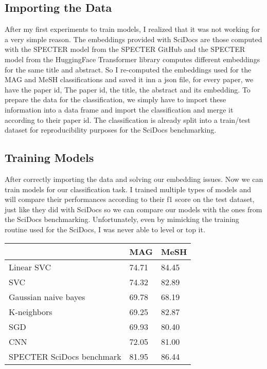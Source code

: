 \documentclass[conference]{IEEEtran}
\begin{document}
\subsection{Importing the Data}

After my first experiments to train models, I realized that it was not working for a very simple reason. The embeddings provided with SciDocs are those computed with the SPECTER model from the SPECTER GitHub and the SPECTER model from the HuggingFace Transformer library computes different embeddings for the same title and abstract. So I re-computed the embeddings used for the MAG and MeSH classifications and saved it inn a json file, for every paper, we have the paper id, The paper id, the title, the abstract and its embedding. To prepare the data for the classification, we simply have to import these information into a data frame and import the classification and merge it according to their paper id. The classification is already split into a train/test dataset for reproducibility purposes for the SciDocs benchmarking.

\subsection{Training Models}

After correctly importing the data and solving our embedding issues. Now we can train models for our classification task. I trained multiple types of models and will compare their performances according to their f1 score on the test dataset, just like they did with SciDocs so we can compare our models with the ones from the SciDocs benchmarking. Unfortunately, even by mimicking the training routine used for the SciDocs, I was never able to level or top it.

\begin{table}[!h]
\centering
\begin{tabular}{|l|l|l|}
\hline
                          & MAG   & MeSH  \\ \hline
Linear SVC                & 74.71 & 84.45 \\ \hline
SVC                       & 74.32 & 82.89 \\ \hline
Gaussian naive bayes      & 69.78 & 68.19 \\ \hline
K-neighbors               & 69.25 & 82.87 \\ \hline
SGD                       & 69.93 & 80.40 \\ \hline
CNN                       & 72.05 & 81.00 \\ \hline
SPECTER SciDocs benchmark & 81.95 & 86.44 \\ \hline
\end{tabular}
\end{table}
\end{document}
